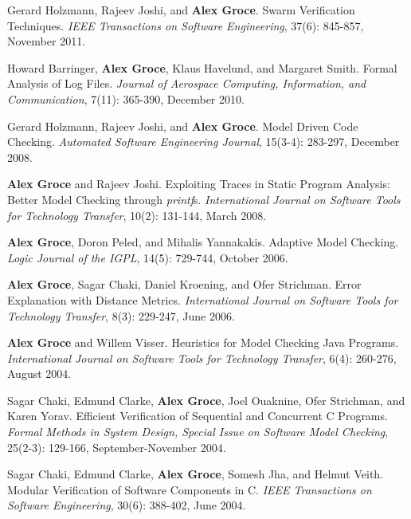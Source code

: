 \documentclass[ComputerScience]{vita}
\begin{document}
\begin{vita}
\begin{Refereed Journal Publications}
\item 
Gerard Holzmann, Rajeev Joshi, and {\bf Alex Groce}.
\newblock Swarm Verification Techniques.
\newblock \emph{IEEE Transactions on Software Engineering}, 37(6): 845-857, November 2011.

\item
Howard Barringer, {\bf Alex Groce}, Klaus Havelund, and Margaret Smith.
\newblock Formal Analysis of Log Files.
\newblock \emph{Journal of Aerospace Computing, Information, and Communication}, 7(11): 365-390, December 2010.

\item Gerard Holzmann, Rajeev Joshi, and {\bf Alex Groce}.
\newblock Model Driven Code Checking.
\newblock \emph{Automated Software Engineering Journal}, 15(3-4): 283-297, December 2008.

\item
{\bf Alex Groce} and Rajeev Joshi.
\newblock Exploiting Traces in Static Program Analysis: Better Model Checking through \emph{printf}s.
\newblock \emph{International Journal on Software Tools for Technology Transfer}, 10(2): 131-144, March 2008.

\item
{\bf Alex Groce}, Doron Peled, and Mihalis Yannakakis.
\newblock Adaptive Model Checking.
\newblock \emph{Logic Journal of the IGPL}, 14(5): 729-744, October 2006.

\item
{\bf Alex Groce}, Sagar Chaki, Daniel Kroening, and Ofer Strichman.
\newblock Error Explanation with Distance Metrics.
\newblock \emph{International Journal on Software Tools for Technology Transfer}, 8(3): 229-247, June 2006.

\item
{\bf Alex Groce} and Willem Visser.
\newblock Heuristics for Model Checking Java Programs.
\newblock \emph{International Journal on Software Tools for Technology Transfer}, 6(4): 260-276, August 2004.


\item
Sagar Chaki, Edmund Clarke, {\bf Alex Groce}, Joel Ouaknine, Ofer Strichman, and Karen Yorav.
\newblock Efficient Verification of Sequential and Concurrent C Programs.
\newblock \emph{Formal Methods in System Design, Special Issue on Software Model Checking}, 25(2-3): 129-166, September-November 2004.

\item
Sagar Chaki, Edmund Clarke, {\bf Alex Groce}, Somesh Jha, and Helmut Veith.
\newblock Modular Verification of Software Components in C.
\newblock \emph{IEEE Transactions on Software Engineering}, 30(6): 388-402, June 2004.


\end{Refereed Journal Publications}
\end{vita}
\end{document}
